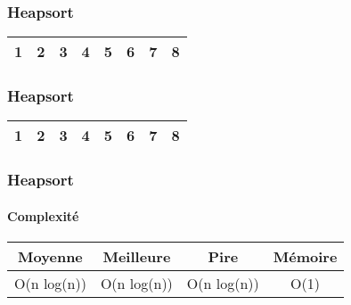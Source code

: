 \begin{frame}
\frametitle{Heapsort}
\begin{table}
\begin{tabular}{| c | c | c | c | c | c | c | c |}
\hline
\cellcolor{red!25}1 & \cellcolor{black!25}2 & \cellcolor{black!25}3 & \cellcolor{black!25}4 & \cellcolor{black!25}5 & \cellcolor{black!25}6 & \cellcolor{black!25}7 & \cellcolor{black!25}8 \\  
\hline
\end{tabular}
\end{table}

\end{frame}

\begin{frame}
\frametitle{Heapsort}
\begin{table}
\begin{tabular}{| c | c | c | c | c | c | c | c |}
\hline
\cellcolor{black!25}1 & \cellcolor{black!25}2 & \cellcolor{black!25}3 & \cellcolor{black!25}4 & \cellcolor{black!25}5 & \cellcolor{black!25}6 & \cellcolor{black!25}7 & \cellcolor{black!25}8 \\  
\hline
\end{tabular}
\end{table}
\end{frame}

\begin{frame}
\frametitle{Heapsort}
\framesubtitle{Complexité}
\begin{table}
\begin{tabular}{| c | c | c | c |}
\hline
Moyenne & Meilleure & Pire & Mémoire\\ 
\hline
O(n log(n)) & O(n log(n)) & O(n log(n)) & O(1)\\
\hline
\end{tabular}
\end{table}
\end{frame}